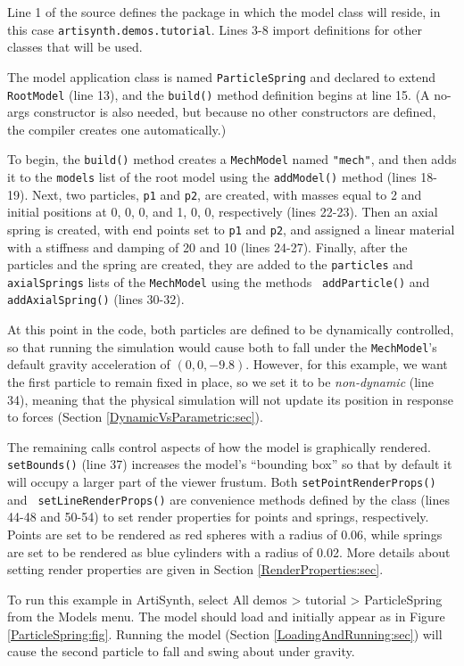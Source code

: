 Line 1 of the source defines the package in which the model class will
reside, in this case {\tt artisynth.demos.tutorial}. Lines 3-8 import
definitions for other classes that will be used.

The model application class is named {\tt ParticleSpring} and declared
to extend {\tt RootModel} (line 13), and the {\tt build()} method
definition begins at line 15. (A no-args constructor is also needed,
but because no other constructors are defined, the compiler creates
one automatically.)

To begin, the {\tt build()} method creates a {\tt MechModel} named
{\tt "mech"}, and then adds it to the {\tt models} list of the root model
using the {\tt addModel()} method (lines 18-19). Next, two particles,
{\tt p1} and {\tt p2}, are created, with masses equal to 2 and initial
positions at 0, 0, 0, and 1, 0, 0, respectively (lines 22-23). Then an
axial spring is created, with end points set to {\tt p1} and {\tt p2},
and assigned a linear material with a stiffness and damping of 20 and
10 (lines 24-27). Finally, after the particles and the spring are
created, they are added to the {\tt particles} and {\tt axialSprings}
lists of the {\tt MechModel} using the methods {\tt
addParticle()} and {\tt addAxialSpring()} (lines 30-32).

At this point in the code, both particles are defined to be
dynamically controlled, so that running the simulation would cause
both to fall under the {\tt MechModel}'s default gravity acceleration
of $(0, 0, -9.8)$. However, for this example, we want the first
particle to remain fixed in place, so we set it to be {\it
non-dynamic} (line 34), meaning that the physical simulation will not
update its position in response to forces (Section
\ref{DynamicVsParametric:sec}).

The remaining calls control aspects of how the model is graphically
rendered.  {\tt setBounds()} (line 37) increases the model's ``bounding
box'' so that by default it will occupy a larger part of the viewer
frustum. Both {\tt setPointRenderProps()} and {\tt
setLineRenderProps()} are convenience methods defined by the class
(lines 44-48 and 50-54) to set render properties for points and
springs, respectively. Points are set to be rendered as red spheres
with a radius of 0.06, while springs are set to be rendered as blue
cylinders with a radius of 0.02. More details about setting render
properties are given in Section \ref{RenderProperties:sec}.

To run this example in ArtiSynth, select {\sf All demos > tutorial >
ParticleSpring} from the {\sf Models} menu. The model should load and
initially appear as in Figure \ref{ParticleSpring:fig}.  Running
the model (Section \ref{LoadingAndRunning:sec}) will
cause the second particle to fall and swing about under gravity.

